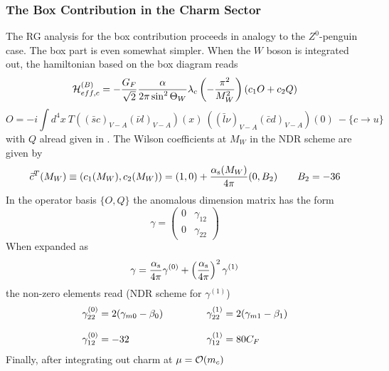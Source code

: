 \subsubsection{The Box Contribution in the Charm Sector}
               \label{sec:HeffRareKB:kpnn:boxcharm}
The RG analysis for the box contribution proceeds in analogy to the
$Z^0$-penguin case. The box part is even somewhat simpler. When the
$W$ boson is integrated out, the hamiltonian based on the box diagram
reads
\begin{equation}\label{hbop}{\cal H}^{(B)}_{eff,c}=-{G_F \over{\sqrt 2}}
{\alpha\over 2\pi \sin^2\Theta_W}\lambda_c\left(-{\pi^2\over M^2_W}\right)
\left( c_1 O +c_2 Q\right) \end{equation}
\begin{equation}\label{ob} O=
   -i\int d^4x\ T\left((\bar sc)_{V-A}(\bar \nu l)_{V-A}\right)(x)\
       \left((\bar l\nu)_{V-A}(\bar cd)_{V-A}\right)(0)\ -
       \{c\to u\}    \end{equation}
with $Q$ alread given in .
The Wilson coefficients at $M_W$ in the NDR scheme are given by
\begin{equation}\label{cmw}
\vec c^T(M_W)\equiv (c_1(M_W),c_2(M_W))=(1,0)+\frac{\alpha_{\rm s}(M_W)}{4 \pi} (0,B_2)
  \qquad B_2=-36  \end{equation}
In the operator basis $\{O,Q\}$ the anomalous dimension matrix  has the form
\begin{equation}\label{gb} \gamma =
 \left(\begin{array}{cc}   0 & \gamma_{12} \\
                           0 & \gamma_{22}
    \end{array}\right)   \end{equation}
When expanded as
\begin{equation}\label{gb2}
\gamma=\frac{\alpha_{\rm s}}{4 \pi} \gamma^{(0)}+\left(\frac{\alpha_{\rm s}}{4 \pi}\right)^2\gamma^{(1)}  \end{equation}
the non-zero elements read (NDR scheme for $\gamma^{(1)}$)
\begin{equation}\label{gbij}
\begin{tabular}{lcl}
$\gamma^{(0)}_{22}=2(\gamma_{m0}-\beta_0)$ &\qquad\qquad&
   $\gamma^{(1)}_{22}=2(\gamma_{m1}-\beta_1)$ \\  & & \\
$\gamma^{(0)}_{12}=-32$ &  &
   $\gamma^{(1)}_{12}=80C_F$ \\
\end{tabular}  \end{equation}
Finally, after integrating out charm at $\mu={\cal O}(m_c)$

